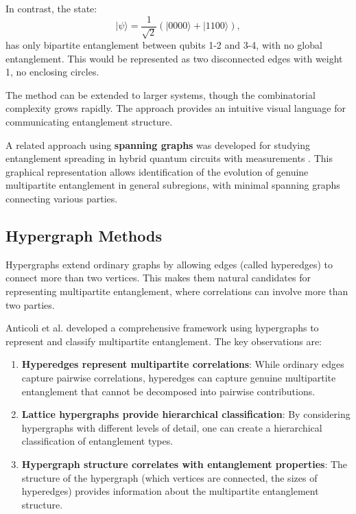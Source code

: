 \documentclass[12pt,a4paper]{article}
\begin{document}
In contrast, the state:
\begin{equation}
	|\psi\rangle = \frac{1}{\sqrt{2}}(|0000\rangle + |1100\rangle),
\end{equation}
has only bipartite entanglement between qubits 1-2 and 3-4, with no global entanglement. This would be represented as two disconnected edges with weight 1, no enclosing circles.

The method can be extended to larger systems, though the combinatorial complexity grows rapidly. The approach provides an intuitive visual language for communicating entanglement structure.

A related approach using \textbf{spanning graphs} was developed for studying entanglement spreading in hybrid quantum circuits with measurements \cite{SpanningGraphs2025}. This graphical representation allows identification of the evolution of genuine multipartite entanglement in general subregions, with minimal spanning graphs connecting various parties.

\subsection{Hypergraph Methods}
\label{sec:hypergraphs}

Hypergraphs extend ordinary graphs by allowing edges (called hyperedges) to connect more than two vertices. This makes them natural candidates for representing multipartite entanglement, where correlations can involve more than two parties.

Anticoli et al. \cite{Undermind} developed a comprehensive framework using hypergraphs to represent and classify multipartite entanglement. The key observations are:

\begin{enumerate}
	\item \textbf{Hyperedges represent multipartite correlations}: While ordinary edges capture pairwise correlations, hyperedges can capture genuine multipartite entanglement that cannot be decomposed into pairwise contributions.

	\item \textbf{Lattice hypergraphs provide hierarchical classification}: By considering hypergraphs with different levels of detail, one can create a hierarchical classification of entanglement types.

	\item \textbf{Hypergraph structure correlates with entanglement properties}: The structure of the hypergraph (which vertices are connected, the sizes of hyperedges) provides information about the multipartite entanglement structure.
\end{enumerate}
\end{document}
